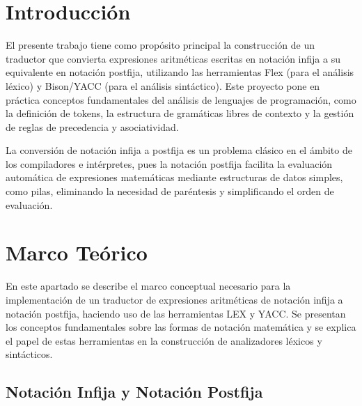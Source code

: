 \documentclass{article}
\begin{document}


\section{Introducción}\label{sec:intr}

El presente trabajo tiene como propósito principal la construcción de un traductor que convierta expresiones aritméticas escritas en notación infija a su equivalente en notación postfija, utilizando las herramientas Flex (para el análisis léxico) y Bison/YACC (para el análisis sintáctico).  
Este proyecto pone en práctica conceptos fundamentales del análisis de lenguajes de programación, como la definición de tokens, la estructura de gramáticas libres de contexto y la gestión de reglas de precedencia y asociatividad.  

La conversión de notación infija a postfija es un problema clásico en el ámbito de los compiladores e intérpretes, pues la notación postfija facilita la evaluación automática de expresiones matemáticas mediante estructuras de datos simples, como pilas, eliminando la necesidad de paréntesis y simplificando el orden de evaluación.  

\section{Marco Teórico}\label{sec:marc}

En este apartado se describe el marco conceptual necesario para la implementación de un traductor de expresiones aritméticas de notación infija a notación postfija, haciendo uso de las herramientas LEX y YACC. Se presentan los conceptos fundamentales sobre las formas de notación matemática y se explica el papel de estas herramientas en la construcción de analizadores léxicos y sintácticos.

\subsection*{Notación Infija y Notación Postfija}
\end{document}
